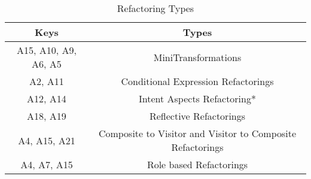 \begin{table}[!htbp]
\caption{Refactoring Types}%
\label{tab-refactoring}
\begin{tabularx}{\textwidth}{c c}
\toprule%
\textbf{Keys}        & \textbf{Types}   \\      
\midrule%
A15, A10, A9, A6, A5 & MiniTransformations                                        \\
A2, A11              & Conditional Expression Refactorings                        \\
A12, A14             & Intent Aspects Refactoring*                                \\
A18, A19             & Reflective Refactorings                                    \\
A4, A15, A21         & Composite to Visitor and Visitor to Composite Refactorings \\
A4, A7, A15          & Role based Refactorings                                    \\
\bottomrule%
\end{tabularx}
\end{table}
